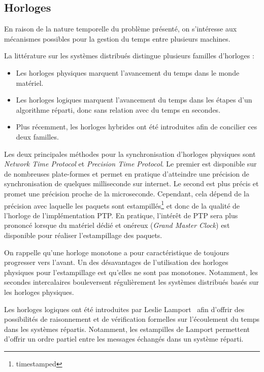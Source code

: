 \documentclass{article}
\begin{document}

\subsection{Horloges}
En raison de la nature temporelle du problème présenté, on s'intéresse aux mécanismes possibles pour la gestion du temps entre plusieurs machines.

La littérature sur les systèmes distribués distingue plusieurs familles d'horloges : 
\begin{itemize}
    \item Les horloges physiques marquent l'avancement du temps dans le monde matériel.
    \item Les horloges logiques marquent l'avancement du temps dans les étapes d'un algorithme réparti, donc sans relation avec du temps en secondes.
    \item Plus récemment, les horloges hybrides ont été introduites afin de concilier ces deux familles.
\end{itemize}

Les deux principales méthodes pour la synchronisation d'horloges physiques sont \emph{Network Time Protocol}\cite{mills1991internet} et \emph{Precision Time Protocol}\cite{peng2009research}. 
Le premier est disponible sur de nombreuses plate-formes et permet en pratique d'atteindre une précision de synchronisation de quelques milliseconde sur internet. 
Le second est plus précis et promet une précision proche de la microseconde. 
Cependant, cela dépend de la précision avec laquelle les paquets sont estampillés\footnote{timestamped} et donc de la qualité de l'horloge de l'implémentation PTP. 
En pratique, l'intérêt de PTP sera plus prononcé lorsque du matériel dédié et onéreux (\emph{Grand Master Clock}) est disponible pour réaliser l'estampillage des paquets.

On rappelle qu'une horloge monotone a pour caractéristique de toujours progresser vers l'avant. 
Un des désavantages de l'utilisation des horloges physiques pour l'estampillage est qu'elles ne sont pas monotones. 
Notamment, les secondes intercalaires bouleversent régulièrement les systèmes distribués basés sur les horloges physiques.

Les horloges logiques ont été introduites par Leslie Lamport~\cite{lamport1978time} afin d'offrir des possibilités de raisonnement et de vérification formelles sur l'écoulement du temps dans les systèmes répartis.
Notamment, les estampilles de Lamport permettent d'offrir un ordre partiel entre les messages échangés dans un système réparti.
\end{document}
